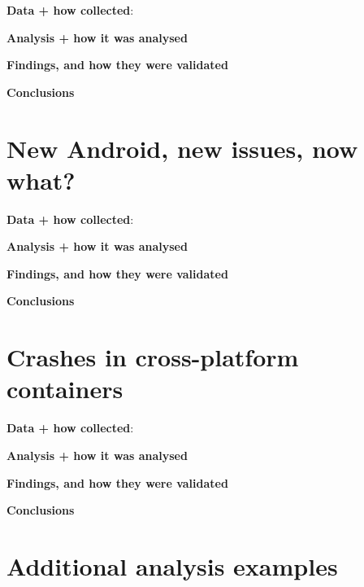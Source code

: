 \textbf{Data + how collected}: 

\textbf{Analysis + how it was analysed}

\textbf{Findings, and how they were validated}

\textbf{Conclusions}


\section{New Android, new issues, now what?}

\textbf{Data + how collected}: 

\textbf{Analysis + how it was analysed}

\textbf{Findings, and how they were validated}

\textbf{Conclusions}


\section{Crashes in cross-platform containers}

\textbf{Data + how collected}: 

\textbf{Analysis + how it was analysed}

\textbf{Findings, and how they were validated}

\textbf{Conclusions}

\section{Additional analysis examples}~\label{appendix-additional-analysis-section}

